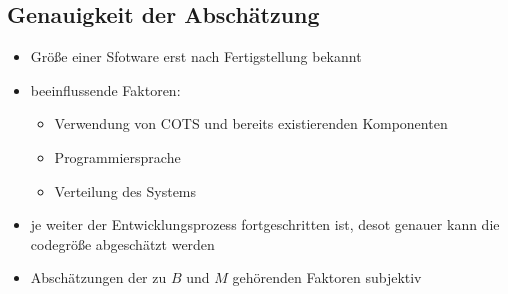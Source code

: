 \subsection{Genauigkeit der Abschätzung}
\begin{itemize}
    \item Größe einer Sfotware erst nach Fertigstellung bekannt
    \item beeinflussende Faktoren:
    \begin{itemize} 
        \item Verwendung von COTS und bereits existierenden Komponenten 
        \item Programmiersprache
        \item Verteilung des Systems
    \end{itemize}
    \item je weiter der Entwicklungsprozess fortgeschritten ist, desot genauer kann die codegröße abgeschätzt werden 
    \item Abschätzungen der zu $B$ und $M$ gehörenden Faktoren subjektiv
\end{itemize}

